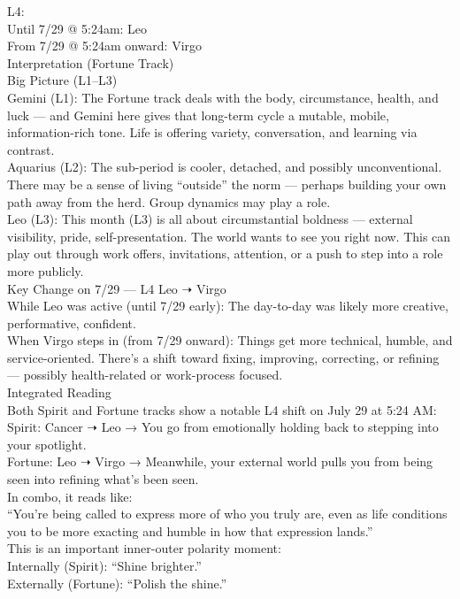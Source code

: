 \documentclass{article}
\begin{document}
L4:\\
Until 7/29 @ 5:24am: Leo\\
From 7/29 @ 5:24am onward: Virgo\\
 Interpretation (Fortune Track)\\
Big Picture (L1--L3)\\
Gemini (L1): The Fortune track deals with the body, circumstance,
health, and luck --- and Gemini here gives that long-term cycle a
mutable, mobile, information-rich tone. Life is offering variety,
conversation, and learning via contrast.\\
Aquarius (L2): The sub-period is cooler, detached, and possibly
unconventional. There may be a sense of living ``outside'' the norm ---
perhaps building your own path away from the herd. Group dynamics may
play a role.\\
Leo (L3): This month (L3) is all about circumstantial boldness ---
external visibility, pride, self-presentation. The world wants to see
you right now. This can play out through work offers, invitations,
attention, or a push to step into a role more publicly.\\
Key Change on 7/29 --- L4 Leo ➝ Virgo\\
While Leo was active (until 7/29 early): The day-to-day was likely more
creative, performative, confident.\\
When Virgo steps in (from 7/29 onward): Things get more technical,
humble, and service-oriented. There's a shift toward fixing, improving,
correcting, or refining --- possibly health-related or work-process
focused.\\
 Integrated Reading\\
Both Spirit and Fortune tracks show a notable L4 shift on July 29 at
5:24 AM:\\
Spirit: Cancer ➝ Leo → You go from emotionally holding back to stepping
into your spotlight.\\
Fortune: Leo ➝ Virgo → Meanwhile, your external world pulls you from
being seen into refining what's been seen.\\
 In combo, it reads like:\\
``You're being called to express more of who you truly are, even as life
conditions you to be more exacting and humble in how that expression
lands.''\\
This is an important inner-outer polarity moment:\\
Internally (Spirit): ``Shine brighter.''\\
Externally (Fortune): ``Polish the shine.''\\
\end{document}

